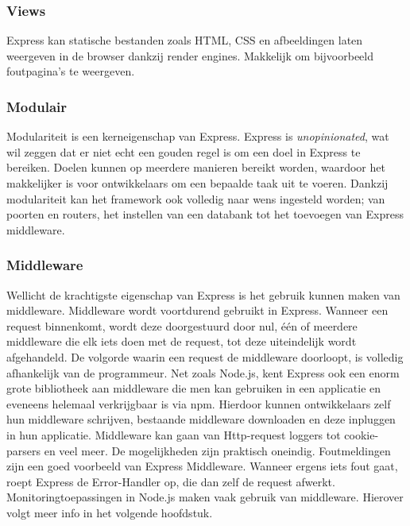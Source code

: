 \subsubsection{Views}
\label{sec:expressViews}

Express kan statische bestanden zoals HTML, CSS en afbeeldingen laten weergeven in de browser dankzij render engines. Makkelijk om bijvoorbeeld foutpagina's te weergeven.

\subsubsection{Modulair}
\label{sec:expressModularity}

Modulariteit is een kerneigenschap van Express. Express is \textit{unopinionated}, wat wil zeggen dat er niet echt een gouden regel is om een doel in Express te bereiken. Doelen kunnen op meerdere manieren bereikt worden, waardoor het makkelijker is voor ontwikkelaars om een bepaalde taak uit te voeren. Dankzij modulariteit kan het framework ook volledig naar wens ingesteld worden; van poorten en routers, het instellen van een databank tot het toevoegen van Express middleware. 

\subsubsection{Middleware}
\label{sec:expressMiddleware}

Wellicht de krachtigste eigenschap van Express is het gebruik kunnen maken van middleware. Middleware wordt voortdurend gebruikt in Express. Wanneer een request binnenkomt, wordt deze doorgestuurd door nul, één of meerdere middleware die elk iets doen met de request, tot deze uiteindelijk wordt afgehandeld. De volgorde waarin een request de middleware doorloopt, is volledig afhankelijk van de programmeur. Net zoals Node.js, kent Express ook een enorm grote bibliotheek aan middleware die men kan gebruiken in een applicatie en eveneens helemaal verkrijgbaar is via npm. Hierdoor kunnen ontwikkelaars zelf hun middleware schrijven, bestaande middleware downloaden en deze inpluggen in hun applicatie. Middleware kan gaan van Http-request loggers tot cookie-parsers en veel meer. De mogelijkheden zijn praktisch oneindig. Foutmeldingen zijn een goed voorbeeld van Express Middleware. Wanneer ergens iets fout gaat, roept Express de Error-Handler op, die dan zelf de request afwerkt. Monitoringtoepassingen in Node.js maken vaak gebruik van middleware. Hierover volgt meer info in het volgende hoofdstuk.

